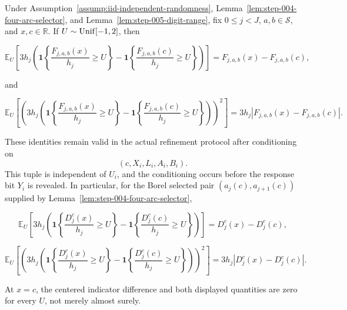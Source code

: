 \begin{proposition}\label{prop:step-005-dither-identities}
Under Assumption~\ref{assump:iid-independent-randomness}, Lemma~\ref{lem:step-004-four-arc-selector}, and Lemma~\ref{lem:step-005-digit-range}, fix \(0\leq j<J\), \(a,b\in\mathcal S\), and \(x,c\in\mathbb R\). If \(U\sim{\rm Unif}[-1,2]\), then

\[
\mathbb E_U\!\left[3h_j\left(
\mathbf 1\!\left\{\frac{F_{j,a,b}(x)}{h_j}\geq U\right\}
-\mathbf 1\!\left\{\frac{F_{j,a,b}(c)}{h_j}\geq U\right\}
\right)\right]
=F_{j,a,b}(x)-F_{j,a,b}(c),
\]

and

\[
\mathbb E_U\!\left[\left(3h_j\left(
\mathbf 1\!\left\{\frac{F_{j,a,b}(x)}{h_j}\geq U\right\}
-\mathbf 1\!\left\{\frac{F_{j,a,b}(c)}{h_j}\geq U\right\}
\right)\right)^2\right]
=3h_j\left|F_{j,a,b}(x)-F_{j,a,b}(c)\right|.
\]

These identities remain valid in the actual refinement protocol after conditioning on
\[
(c,X_i,L_i,A_i,B_i).
\]
This tuple is independent of \(U_i\), and the conditioning occurs before the response
bit \(Y_i\) is revealed. In particular, for the Borel selected pair
\((a_j(c),a_{j+1}(c))\) supplied by
Lemma~\ref{lem:step-004-four-arc-selector},

\[
\mathbb E_U\!\left[3h_j\left(
\mathbf 1\!\left\{\frac{D_j^c(x)}{h_j}\geq U\right\}
-\mathbf 1\!\left\{\frac{D_j^c(c)}{h_j}\geq U\right\}
\right)\right]
=D_j^c(x)-D_j^c(c),
\]

\[
\mathbb E_U\!\left[\left(3h_j\left(
\mathbf 1\!\left\{\frac{D_j^c(x)}{h_j}\geq U\right\}
-\mathbf 1\!\left\{\frac{D_j^c(c)}{h_j}\geq U\right\}
\right)\right)^2\right]
=3h_j\left|D_j^c(x)-D_j^c(c)\right|.
\]

At \(x=c\), the centered indicator difference and both displayed quantities are zero for every \(U\), not merely almost surely.
\end{proposition}

